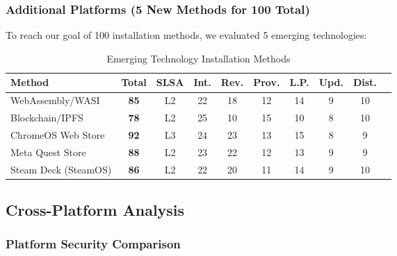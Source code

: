 \documentclass[11pt,a4paper]{article}
\begin{document}
\subsubsection{Additional Platforms (5 New Methods for 100 Total)}

To reach our goal of 100 installation methods, we evaluated 5 emerging technologies:

\begin{table}[h]
\centering
\caption{Emerging Technology Installation Methods}
\begin{tabular}{lccccccccc}
\toprule
\textbf{Method} & \textbf{Total} & \textbf{SLSA} & \textbf{Int.} & \textbf{Rev.} & \textbf{Prov.} & \textbf{L.P.} & \textbf{Upd.} & \textbf{Dist.} \\
\midrule
WebAssembly/WASI & \textbf{85} & L2 & 22 & 18 & 12 & 14 & 9 & 10 \\
Blockchain/IPFS & \textbf{78} & L2 & 25 & 10 & 15 & 10 & 8 & 10 \\
ChromeOS Web Store & \textbf{92} & L3 & 24 & 23 & 13 & 15 & 8 & 9 \\
Meta Quest Store & \textbf{88} & L2 & 23 & 22 & 12 & 13 & 9 & 9 \\
Steam Deck (SteamOS) & \textbf{86} & L2 & 22 & 20 & 11 & 14 & 9 & 10 \\
\bottomrule
\end{tabular}
\end{table}

\subsection{Cross-Platform Analysis}

\subsubsection{Platform Security Comparison}
\end{document}
